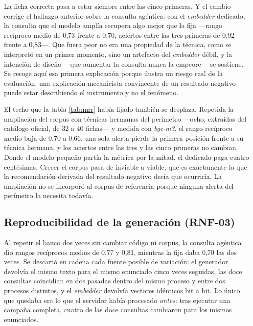 La ficha correcta pasa a estar siempre entre las cinco primeras. Y el cambio corrige el hallazgo
anterior sobre la consulta agéntica: con el \emph{embedder} dedicado, la consulta que el modelo
amplía recupera algo mejor que la fija ---rango recíproco medio de 0,73 frente a 0,70, aciertos
entre las tres primeras de 0,92 frente a 0,83---. Que fuera peor no era una propiedad de la técnica,
como se interpretó en un primer momento, sino un artefacto del \emph{embedder} débil, y la intención
de diseño ---que aumentar la consulta nunca la empeore--- se sostiene. Se recoge aquí esa primera
explicación porque ilustra un riesgo real de la evaluación: una explicación
mecanicista convincente de un resultado negativo puede estar describiendo el instrumento y no el
fenómeno.

El techo que la tabla \ref{tab:mrr} había fijado también se desplaza. Repetida la ampliación del
corpus con técnicas hermanas del perímetro ---ocho, extraídas del catálogo oficial, de 32 a 40
fichas--- y medida con \emph{bge-m3}, el rango recíproco medio baja de 0,70 a 0,66, una sola
alerta pierde la primera posición frente a su técnica hermana, y los aciertos entre las tres y las
cinco primeras no cambian. Donde el modelo pequeño partía la métrica por la mitad, el dedicado
paga cuatro centésimas. Crecer el corpus pasa de inviable a viable, que es exactamente lo que la
recomendación derivada del resultado negativo decía que ocurriría. La ampliación no se incorporó al
corpus de referencia porque ninguna alerta del perímetro la necesita todavía.

\subsection{Reproducibilidad de la generación (RNF-03)}

Al repetir el banco dos veces sin cambiar código ni corpus, la consulta agéntica dio rangos
recíprocos medios de 0,77 y 0,81, mientras la fija daba 0,70 las dos veces. Se descartó en cadena
cada fuente posible de variación: el generador devolvía el mismo texto para el mismo enunciado
cinco veces seguidas, las doce consultas coincidían en dos pasadas dentro del mismo proceso y entre
dos procesos distintos, y el \emph{embedder} devolvía vectores idénticos bit a bit. Lo único que
quedaba era lo que el servidor había procesado \emph{antes}: tras ejecutar una campaña completa,
cuatro de las doce consultas cambiaron para los mismos enunciados.

